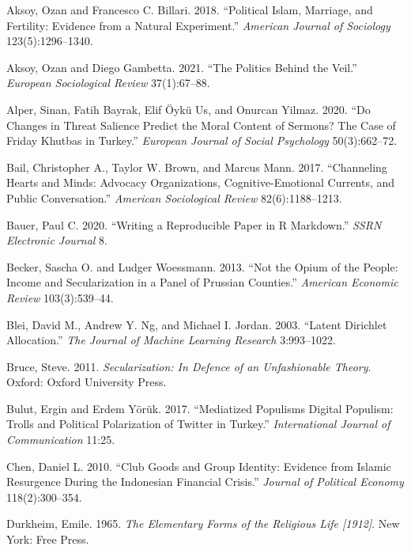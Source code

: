 \documentclass[
  12pt,
]{article}
\begin{document}
\leavevmode\hypertarget{ref-aksoy2018political}{}%
Aksoy, Ozan and Francesco C. Billari. 2018. ``Political Islam, Marriage, and Fertility: Evidence from a Natural Experiment.'' \emph{American Journal of Sociology} 123(5):1296--1340.

\leavevmode\hypertarget{ref-AG21}{}%
Aksoy, Ozan and Diego Gambetta. 2021. ``The Politics Behind the Veil.'' \emph{European Sociological Review} 37(1):67--88.

\leavevmode\hypertarget{ref-alper2020changes}{}%
Alper, Sinan, Fatih Bayrak, Elif Öykü Us, and Onurcan Yilmaz. 2020. ``Do Changes in Threat Salience Predict the Moral Content of Sermons? The Case of Friday Khutbas in Turkey.'' \emph{European Journal of Social Psychology} 50(3):662--72.

\leavevmode\hypertarget{ref-bail2017channeling}{}%
Bail, Christopher A., Taylor W. Brown, and Marcus Mann. 2017. ``Channeling Hearts and Minds: Advocacy Organizations, Cognitive-Emotional Currents, and Public Conversation.'' \emph{American Sociological Review} 82(6):1188--1213.

\leavevmode\hypertarget{ref-bauer2020writing}{}%
Bauer, Paul C. 2020. ``Writing a Reproducible Paper in R Markdown.'' \emph{SSRN Electronic Journal} 8.

\leavevmode\hypertarget{ref-becker2013not}{}%
Becker, Sascha O. and Ludger Woessmann. 2013. ``Not the Opium of the People: Income and Secularization in a Panel of Prussian Counties.'' \emph{American Economic Review} 103(3):539--44.

\leavevmode\hypertarget{ref-blei2003latent}{}%
Blei, David M., Andrew Y. Ng, and Michael I. Jordan. 2003. ``Latent Dirichlet Allocation.'' \emph{The Journal of Machine Learning Research} 3:993--1022.

\leavevmode\hypertarget{ref-bruce2011sec}{}%
Bruce, Steve. 2011. \emph{Secularization: In Defence of an Unfashionable Theory}. Oxford: Oxford University Press.

\leavevmode\hypertarget{ref-bulut2017mediatized}{}%
Bulut, Ergin and Erdem Yörük. 2017. ``Mediatized Populisms\textbar{} Digital Populism: Trolls and Political Polarization of Twitter in Turkey.'' \emph{International Journal of Communication} 11:25.

\leavevmode\hypertarget{ref-chen2010club}{}%
Chen, Daniel L. 2010. ``Club Goods and Group Identity: Evidence from Islamic Resurgence During the Indonesian Financial Crisis.'' \emph{Journal of Political Economy} 118(2):300--354.

\leavevmode\hypertarget{ref-durkheim1965elementary}{}%
Durkheim, Emile. 1965. \emph{The Elementary Forms of the Religious Life {[}1912{]}}. New York: Free Press.
\end{document}
